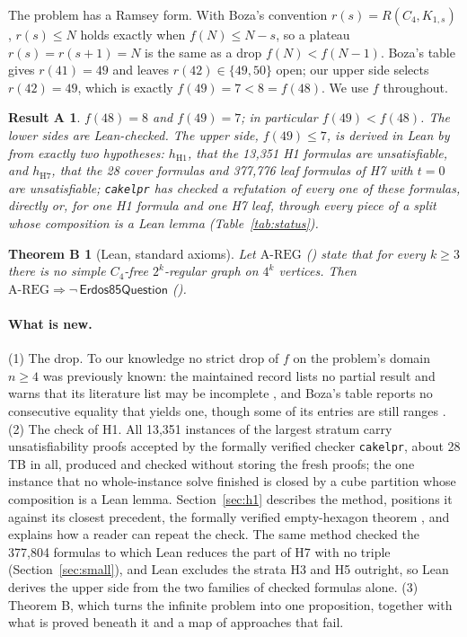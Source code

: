 \documentclass{anvil-paper}
\newcommand{\AREG}{\mathrm{A\text{-}REG}}
\newcommand{\Qn}{\textsf{Erdos85Question}}
\newcommand{\cakelpr}{\texttt{cake\textunderscore lpr}}
\newtheorem*{resultA}{Result A}
\newtheorem*{theoremB}{Theorem B}
\theoremstyle{definition}
\begin{document}
The problem has a Ramsey form. With Boza's convention $r(s)=R(C_4,K_{1,s})$ \citep{boza2024ramsey,zhang2017polarity}, $r(s)\le N$ holds exactly when $f(N)\le N-s$, so a plateau $r(s)=r(s+1)=N$ is the same as a drop $f(N)<f(N-1)$. Boza's table gives $r(41)=49$ and leaves $r(42)\in\{49,50\}$ open; our upper side selects $r(42)=49$, which is exactly $f(49)=7<8=f(48)$. We use $f$ throughout.

\begin{resultA}
$f(48)=8$ and $f(49)=7$; in particular $f(49)<f(48)$. The lower sides are Lean-checked. The upper side, $f(49)\le 7$, is derived in Lean by  from exactly two hypotheses: $h_{\mathrm{H1}}$, that the 13,351 H1 formulas are unsatisfiable, and $h_{\mathrm{H7}}$, that the 28 cover formulas and 377,776 leaf formulas of H7 with $t=0$ are unsatisfiable; \cakelpr{} has checked a refutation of every one of these formulas, directly or, for one H1 formula and one H7 leaf, through every piece of a split whose composition is a Lean lemma (Table~\ref{tab:status}).
\end{resultA}

\begin{theoremB}[Lean, standard axioms]
Let $\AREG$ () state that for every $k\ge 3$ there is no simple $C_4$-free $2^k$-regular graph on $4^k$ vertices. Then $\AREG\Rightarrow\neg\,\Qn$ ().
\end{theoremB}

\paragraph{What is new.} (1) The drop. To our knowledge no strict drop of $f$ on the problem's domain $n\ge 4$ was previously known: the maintained record lists no partial result and warns that its literature list may be incomplete \citep{bloom-erdos85}, and Boza's table reports no consecutive equality that yields one, though some of its entries are still ranges \citep{boza2024ramsey}. (2) The check of H1. All 13,351 instances of the largest stratum carry unsatisfiability proofs accepted by the formally verified checker \cakelpr{}, about 28 TB in all, produced and checked without storing the fresh proofs; the one instance that no whole-instance solve finished is closed by a cube partition whose composition is a Lean lemma. Section~\ref{sec:h1} describes the method, positions it against its closest precedent, the formally verified empty-hexagon theorem \citep{heule2024hexagon,subercaseaux2024hexagonlean}, and explains how a reader can repeat the check. The same method checked the 377,804 formulas to which Lean reduces the part of H7 with no triple (Section~\ref{sec:small}), and Lean excludes the strata H3 and H5 outright, so Lean derives the upper side from the two families of checked formulas alone. (3) Theorem B, which turns the infinite problem into one proposition, together with what is proved beneath it and a map of approaches that fail.
\end{document}
